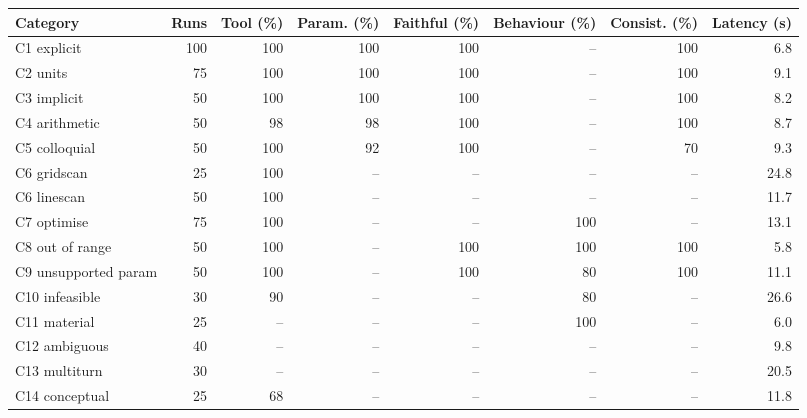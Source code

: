\begin{tabular}{lrrrrrrr}
\toprule
Category & Runs & Tool (\%) & Param. (\%) & Faithful (\%) & Behaviour (\%) & Consist. (\%) & Latency (s)\\
\midrule
C1 explicit & 100 & 100 & 100 & 100 & -- & 100 & 6.8\\
C2 units & 75 & 100 & 100 & 100 & -- & 100 & 9.1\\
C3 implicit & 50 & 100 & 100 & 100 & -- & 100 & 8.2\\
C4 arithmetic & 50 & 98 & 98 & 100 & -- & 100 & 8.7\\
C5 colloquial & 50 & 100 & 92 & 100 & -- & 70 & 9.3\\
C6 gridscan & 25 & 100 & -- & -- & -- & -- & 24.8\\
C6 linescan & 50 & 100 & -- & -- & -- & -- & 11.7\\
C7 optimise & 75 & 100 & -- & -- & 100 & -- & 13.1\\
C8 out of range & 50 & 100 & -- & 100 & 100 & 100 & 5.8\\
C9 unsupported param & 50 & 100 & -- & 100 & 80 & 100 & 11.1\\
C10 infeasible & 30 & 90 & -- & -- & 80 & -- & 26.6\\
C11 material & 25 & -- & -- & -- & 100 & -- & 6.0\\
C12 ambiguous & 40 & -- & -- & -- & -- & -- & 9.8\\
C13 multiturn & 30 & -- & -- & -- & -- & -- & 20.5\\
C14 conceptual & 25 & 68 & -- & -- & -- & -- & 11.8\\
\bottomrule
\end{tabular}
